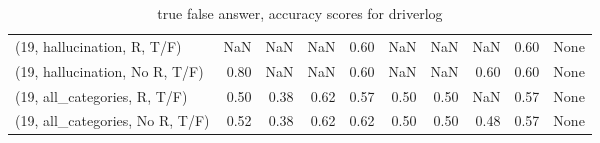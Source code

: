 \begin{table*}[h!]
\begin{adjustbox}{width=2\columnwidth,center}
\begin{tabular}{lrrr|rrr|rrr}
(19, hallucination, R, T/F)           &                       NaN &                   NaN &                       NaN &                          0.60 &                       NaN &                           NaN &                                    NaN &                               0.60 &                                  None \\
(19, hallucination, No R, T/F)        &                      0.80 &                   NaN &                       NaN &                          0.60 &                       NaN &                           NaN &                                   0.60 &                               0.60 &                                  None \\
(19, all\_categories, R, T/F)          &                      0.50 &                  0.38 &                      0.62 &                          0.57 &                      0.50 &                          0.50 &                                    NaN &                               0.57 &                                  None \\
(19, all\_categories, No R, T/F)       &                      0.52 &                  0.38 &                      0.62 &                          0.62 &                      0.50 &                          0.50 &                                   0.48 &                               0.57 &                                  None \\


\bottomrule
\end{tabular}
\end{adjustbox}
\caption{true false answer, accuracy scores for driverlog}
\end{table*}